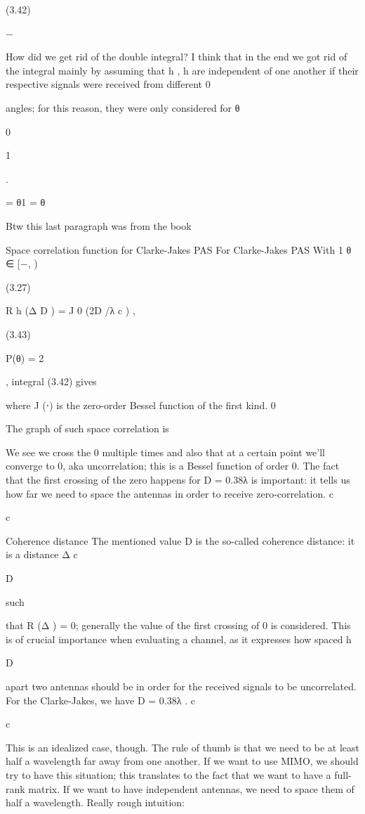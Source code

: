 {{{{(3.42)

−\pi

​How did we get rid of the double integral?
I think that in the end we got rid of the integral mainly by assuming that h , h are independent of one another if their respective signals were received from different 0

angles; for this reason, they were only considered for θ

0

1

.

= θ1 = θ

Btw this last paragraph was from the book

Space correlation function for Clarke-Jakes PAS For Clarke-Jakes PAS With 1 θ ∈ [−\pi, \pi)

(3.27)

R h (Δ D ) = J 0 (2 D /λ c ) ,

(3.43)

P(θ) =
2\pi

, integral (3.42) gives

where J (⋅) is the zero-order Bessel function of the first kind.
0

The graph of such space correlation is

We see we cross the 0 multiple times and also that at a certain point we'll converge to 0, aka uncorrelation; this is a Bessel function of order 0.
The fact that the first crossing of the zero happens for D = 0.38λ is important: it tells us how far we need to space the antennas in order to receive zero-correlation.
c

c

Coherence distance The mentioned value D is the so-called coherence distance: it is a distance Δ c

D

such

that R (Δ ) = 0; generally the value of the first crossing of 0 is considered.
This is of crucial importance when evaluating a channel, as it expresses how spaced h

D

apart two antennas should be in order for the received signals to be uncorrelated.
For the Clarke-Jakes, we have D = 0.38λ .
c

c

This is an idealized case, though. The rule of thumb is that we need to be at least half a wavelength far away from one another. If we want to use MIMO, we should try to have this situation; this translates to the fact that we want to have a full-rank matrix. If we want to have independent antennas, we need to space them of half a wavelength.
Really rough intuition:

}}}}
